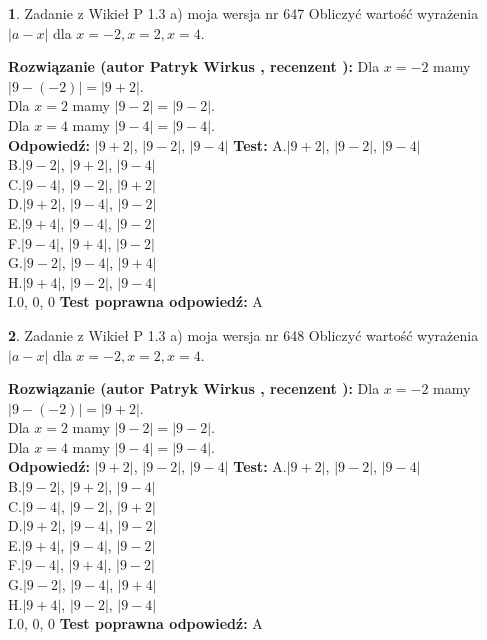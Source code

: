 \documentclass[12pt, a4paper]{article}
\theoremstyle{definition} %
\newtheorem{zad}{}
\newcommand{\zadStart}[1]{\begin{zad}#1\newline}
\newcommand{\zadStop}{\end{zad}}
\newcommand{\rozwStart}[2]{\noindent \textbf{Rozwiązanie (autor #1 , recenzent #2): }\newline}
\newcommand{\rozwStop}{\newline}
\newcommand{\odpStart}{\noindent \textbf{Odpowiedź:}\newline}
\newcommand{\odpStop}{\newline}
\newcommand{\testStart}{\noindent \textbf{Test:}\newline}
\newcommand{\testStop}{\newline}
\newcommand{\kluczStart}{\noindent \textbf{Test poprawna odpowiedź:}\newline}
\newcommand{\kluczStop}{\newline}
\begin{document}
\zadStart{Zadanie z Wikieł P 1.3 a) moja wersja nr 647}
Obliczyć wartość wyrażenia $|a - x|$ dla $x=-2,x=2,x=4$.
\zadStop
\rozwStart{Patryk Wirkus}{}
Dla $x = -2$ mamy $|9 - (-2)| = |9 + 2|$.\\
Dla $x = 2$ mamy $|9 - 2| = |9 - 2|$.\\
Dla $x = 4$ mamy $|9 - 4| = |9 - 4|$.\\
\rozwStop
\odpStart
$|9 + 2|$, $|9 - 2|$, $|9 - 4|$
\odpStop
\testStart
A.$|9 + 2|$, $|9 - 2|$, $|9 - 4|$\\
B.$|9 - 2|$, $|9 + 2|$, $|9 - 4|$\\
C.$|9 - 4|$, $|9 - 2|$, $|9 + 2|$\\
D.$|9 + 2|$, $|9 - 4|$, $|9 - 2|$\\
E.$|9 + 4|$, $|9 - 4|$, $|9 - 2|$\\
F.$|9 - 4|$, $|9 + 4|$, $|9 - 2|$\\
G.$|9 - 2|$, $|9 - 4|$, $|9 + 4|$\\
H.$|9 + 4|$, $|9 - 2|$, $|9 - 4|$\\
I.$0$, $0$, $0$
\testStop
\kluczStart
A
\kluczStop



\zadStart{Zadanie z Wikieł P 1.3 a) moja wersja nr 648}
Obliczyć wartość wyrażenia $|a - x|$ dla $x=-2,x=2,x=4$.
\zadStop
\rozwStart{Patryk Wirkus}{}
Dla $x = -2$ mamy $|9 - (-2)| = |9 + 2|$.\\
Dla $x = 2$ mamy $|9 - 2| = |9 - 2|$.\\
Dla $x = 4$ mamy $|9 - 4| = |9 - 4|$.\\
\rozwStop
\odpStart
$|9 + 2|$, $|9 - 2|$, $|9 - 4|$
\odpStop
\testStart
A.$|9 + 2|$, $|9 - 2|$, $|9 - 4|$\\
B.$|9 - 2|$, $|9 + 2|$, $|9 - 4|$\\
C.$|9 - 4|$, $|9 - 2|$, $|9 + 2|$\\
D.$|9 + 2|$, $|9 - 4|$, $|9 - 2|$\\
E.$|9 + 4|$, $|9 - 4|$, $|9 - 2|$\\
F.$|9 - 4|$, $|9 + 4|$, $|9 - 2|$\\
G.$|9 - 2|$, $|9 - 4|$, $|9 + 4|$\\
H.$|9 + 4|$, $|9 - 2|$, $|9 - 4|$\\
I.$0$, $0$, $0$
\testStop
\kluczStart
A
\kluczStop
\end{document}

